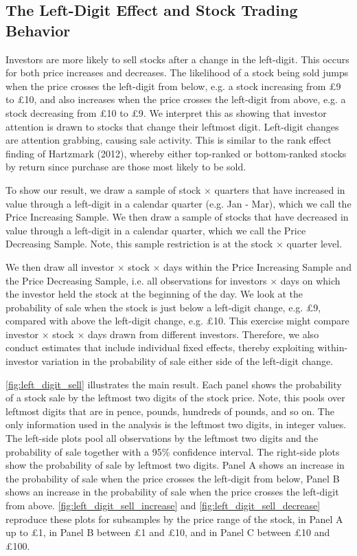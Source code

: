 \subsection*{The Left-Digit Effect and Stock Trading Behavior}

Investors are more likely to sell stocks after a change in the left-digit. This occurs for both price increases and decreases. The likelihood of a stock being sold jumps when the price crosses the left-digit from below, e.g. a stock increasing from \pounds9 to \pounds10, and also increases when the price crosses the left-digit from above, e.g. a stock decreasing from \pounds10 to \pounds9. We interpret this as showing that investor attention is drawn to stocks that change their leftmost digit. Left-digit changes are attention grabbing, causing sale activity. This is similar to the rank effect finding of Hartzmark (2012), whereby either top-ranked or bottom-ranked stocks by return since purchase are those most likely to be sold.

To show our result, we draw a sample of stock $\times$ quarters that have increased in value through a left-digit in a calendar quarter (e.g. Jan - Mar), which we call the Price Increasing Sample. We then draw a sample of stocks that have decreased in value through a left-digit in a calendar quarter, which we call the Price Decreasing Sample. Note, this sample restriction is at the stock $\times$ quarter level.

We then draw all investor $\times$ stock $\times$ days within the Price Increasing Sample and the Price Decreasing Sample, i.e. all observations for investors $\times$ days on which the investor held the stock at the beginning of the day. We look at the probability of sale when the stock is just below a left-digit change, e.g. \pounds9, compared with above the left-digit change, e.g. \pounds10. This exercise might compare investor $\times$ stock $\times$ days drawn from different investors. Therefore, we also conduct estimates that include individual fixed effects, thereby exploiting within-investor variation in the probability of sale either side of the left-digit change.

\ref{fig:left_digit_sell} illustrates the main result. Each panel shows the probability of a stock sale by the leftmost two digits of the stock price. Note, this pools over leftmost digits that are in pence, pounds, hundreds of pounds, and so on. The only information used in the analysis is the leftmost two digits, in integer values. The left-side plots pool all observations by the leftmost two digits and the probability of sale together with a 95\% confidence interval. The right-side plots show the probability of sale by leftmost two digits. Panel A shows an increase in the probability of sale when the price crosses the left-digit from below, Panel B shows an increase in the probability of sale when the price crosses the left-digit from above. \ref{fig:left_digit_sell_increase} and \ref{fig:left_digit_sell_decrease} reproduce these plots for subsamples by the price range of the stock, in Panel A up to \pounds1, in Panel B between \pounds1 and \pounds10, and in Panel C between \pounds10 and \pounds100.

